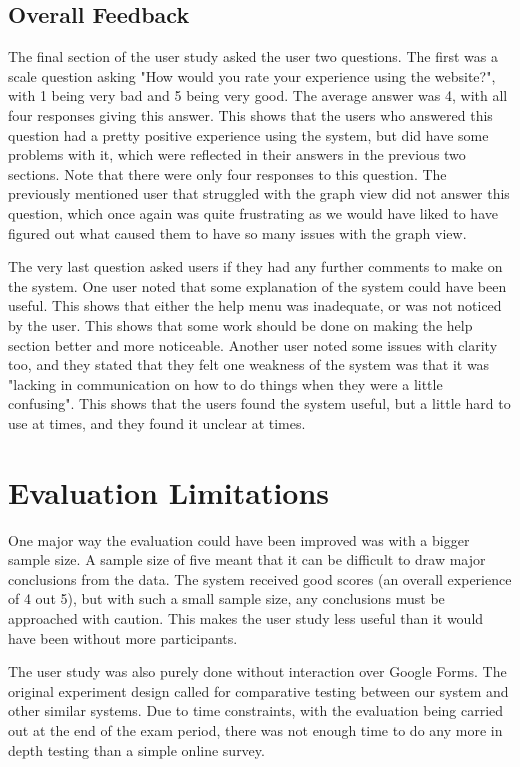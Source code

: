 \documentclass[10pt, journal]{IEEEtran}
\begin{document}
\subsection{Overall Feedback}

The final section of the user study asked the user two questions. The first was a scale question asking "How would you rate your experience using the website?", with 1 being very bad and 5 being very good. The average answer was 4, with all four responses giving this answer. This shows that the users who answered this question had a pretty positive experience using the system, but did have some problems with it, which were reflected in their answers in the previous two sections. Note that there were only four responses to this question. The previously mentioned user that struggled with the graph view did not answer this question, which once again was quite frustrating as we would have liked to have figured out what caused them to have so many issues with the graph view.

The very last question asked users if they had any further comments to make on the system. One user noted that some explanation of the system could have been useful. This shows that either the help menu was inadequate, or was not noticed by the user. This shows that some work should be done on making the help section better and more noticeable. Another user noted some issues with clarity too, and they stated that they felt one weakness of the system was that it was "lacking in communication on how to do things when they were a little confusing". This shows that the users found the system useful, but a little hard to use at times, and they found it unclear at times.

\section{Evaluation Limitations}

One major way the evaluation could have been improved was with a bigger sample size. A sample size of five meant that it can be difficult to draw major conclusions from the data. The system received good scores (an overall experience of 4 out 5), but with such a small sample size, any conclusions must be approached with caution. This makes the user study less useful than it would have been without more participants. 

The user study was also purely done without interaction over Google Forms. The original experiment design called for comparative testing between our system and other similar systems. Due to time constraints, with the evaluation being carried out at the end of the exam period, there was not enough time to do any more in depth testing than a simple online survey.
\end{document}
